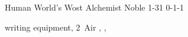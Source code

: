 
\filledCS%
  {\currentName}%
  {Human}%
  {World's Wost Alchemist}%
  {Noble}%
  {{1}{-3}{1}}%
  {{0}{-1}{-1}}%
  {%
    \renewcommand\rank{Fodder}
    \renewcommand\characterDebt{100 \glspl{sp}}

    \renewcommand\charSpells{
      \showSpells{Air1}
      \showSpells{Air1}

      \vspace{\baselineskip}
      \bigLine
      \vspace{\baselineskip}

      These higher level spells may only be cast by using an Air \gls{boon} to raise the Air \gls{sphere} by 1~level.

      \bigLine

      \showSpells{Air2}
      \showSpells{Air3}
    }
    \setcounter{Academics}{2}
    \setcounter{Cultivation}{1}
    \setcounter{Empathy}{1}
    \setcounter{Vigilance}{1}
    \setcounter{Deceit}{1}

    \setcounter{Air}{1}
    \Dagger
    \addtocounter{equipmentWeight}{3}
  }%
  {\ritualcaster}%
  {writing equipment, 2~Air , \rations, }%

